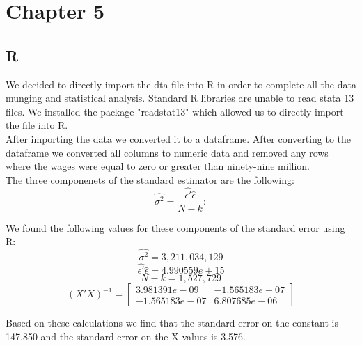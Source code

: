 \documentclass{article}
\begin{document}
\section{Chapter 5}

\subsection{R}

We decided to directly import the dta file into R in order to complete all the data munging and statistical analysis.  Standard R libraries are unable to read stata 13 files.  We installed the package "readstat13" which allowed us to directly import the file into R.
\\
After importing the data we converted it to a dataframe.  After converting to the dataframe we converted all columns to numeric data and removed any rows where the wages were equal to zero or greater than ninety-nine million.  
\\
The three componenets of the standard estimator are the following:
\\

\begin{equation}
\hat{\sigma^2}=\frac{\hat{\epsilon'} \hat{\epsilon}}{N-k}:
\end{equation}

We found the following values for these components of the standard error using R:
\\
\begin{equation}
\hat{\sigma^2}=3,211,034,129
\end{equation}
\begin{equation}
\hat{\epsilon'}\hat{\epsilon}=4.990559e+15
\end{equation}
\begin{equation}
N-k=1,527,729
\end{equation}
\begin{equation}
(X'X)^{-1}=
\begin{bmatrix}

3.981391e-09 & -1.565183e-07 \\
-1.565183e-07 & 6.807685e-06
\end{bmatrix}

\end{equation}

Based on these calculations we find that the standard error on the constant is 147.850 and the standard error on the X values is 3.576.
\end{document}

